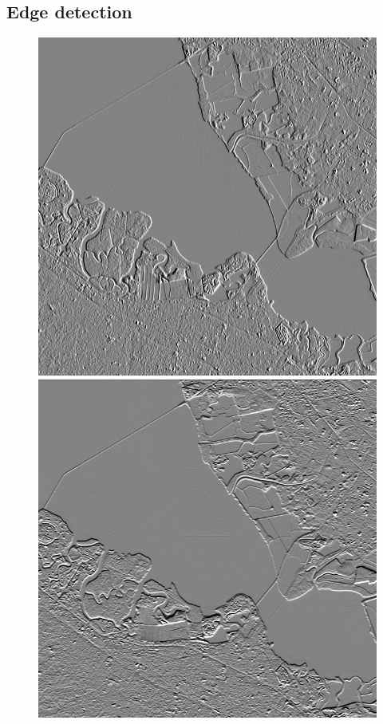 \documentclass[12pt]{article}
\begin{document}
\clearpage

\subsection{Edge detection}

\begin{figure}[h!]
    \centering
    \includegraphics[width=.48\linewidth]{figures/p8/aster_vertical.png}
    \includegraphics[width=.48\linewidth]{figures/p8/aster_horizontal.png}


\end{figure}
\end{document}

